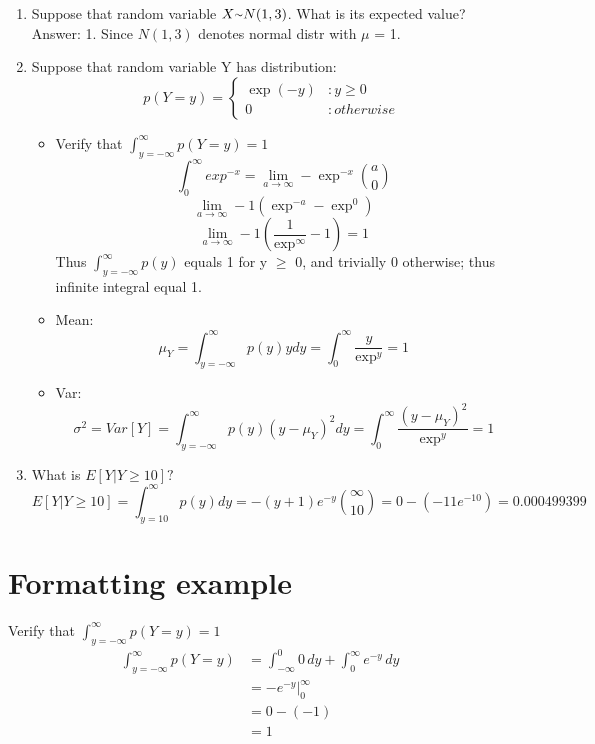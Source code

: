 \documentclass{article}
\newcommand{\mytilde}{\raise.17ex\hbox{$\scriptstyle\mathtt{\sim}$}}
\begin{document}
\begin{enumerate}
		\item Suppose that random variable $X \mytilde N(1, 3)$. What is its expected value?\\
		Answer: 1. Since $ N(1, 3)$ denotes normal distr with $\mu$ = 1.
		
		\item Suppose that random variable Y has distribution:
		\begin{displaymath}
			p(Y = y) = \left\{
			\begin{array}{lr}
			\exp(-y) & : y \ge 0\\
			0 & : otherwise
			\end{array}
			\right.
		\end{displaymath} 
		
		\begin{itemize}
			\item Verify that $\int_{y=-\infty}^\infty p(Y=y)=1$\\
			$$\int_0^\infty exp^{-x} = \lim_{a\to\infty} -\exp^{-x} \binom a0$$
			$$\lim_{a\to\infty} -1 (\exp^{-a}-\exp^0)$$
			$$\lim_{a\to\infty} -1 (\frac{1}{\exp^{\infty}} - 1) = 1$$			
			Thus $\int_{y=-\infty}^\infty p(y)$ equals 1 for y $\ge$ 0, and trivially 0 otherwise; thus infinite integral equal 1. 
			
			\item Mean:
			$$\mu_Y = \int_{y=-\infty}^\infty p(y)ydy = \int_{0}^{\infty} \frac{y}{\exp^y} = 1$$
			
			\item Var:
			$$\sigma^2 = Var[Y] = \int_{y=-\infty}^\infty p(y)(y-\mu_Y)^2dy = \int_{0}^{\infty} \frac{(y-\mu_Y)^2}{\exp^y} = 1$$
		\end{itemize}
		
		\item What is $E[Y | Y \ge 10]?$
		$$E[Y | Y \ge 10] = \int_{y=10}^\infty p(y)dy = -(y+1)e^{-y} \binom \infty {10} = 0 - (-11e^{-10}) = 0.000499399 $$
		
	\end{enumerate}
	
\section{Formatting example} %
	Verify that $\int_{y = -\infty}^{\infty} p(Y = y) = 1$
	\begin{align*}
	\int_{y = -\infty}^{\infty} p(Y = y) &= \int_{-\infty}^{0} 0\, dy + \int_{0}^{\infty} e^{-y}\, dy \\
	&= \left. -e^{-y} \right|_0^\infty \\
	&= 0 - (-1) \\
	&= 1
	\end{align*}
     
     
\end{document}
